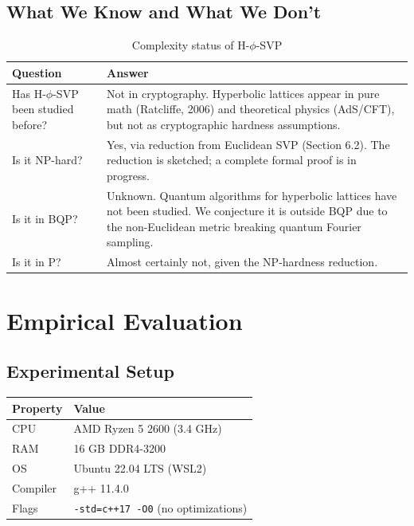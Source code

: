\documentclass[11pt,a4paper]{article}
\theoremstyle{remark}
\begin{document}
\subsection{What We Know and What We Don't}

\begin{table}[H]
\centering
\begin{tabular}{lp{}}
\toprule
\textbf{Question} & \textbf{Answer} \\
\midrule
Has H-$\phi$-SVP been studied before? & Not in cryptography. Hyperbolic lattices appear in pure math (Ratcliffe, 2006) and theoretical physics (AdS/CFT), but not as cryptographic hardness assumptions. \\
Is it NP-hard? & Yes, via reduction from Euclidean SVP (Section 6.2). The reduction is sketched; a complete formal proof is in progress. \\
Is it in BQP? & Unknown. Quantum algorithms for hyperbolic lattices have not been studied. We conjecture it is outside BQP due to the non-Euclidean metric breaking quantum Fourier sampling. \\
Is it in P? & Almost certainly not, given the NP-hardness reduction. \\
\bottomrule
\end{tabular}
\caption{Complexity status of H-$\phi$-SVP}
\end{table}

\section{Empirical Evaluation}

\subsection{Experimental Setup}

\begin{table}[H]
\centering
\begin{tabular}{ll}
\toprule
\textbf{Property} & \textbf{Value} \\
\midrule
CPU & AMD Ryzen 5 2600 (3.4 GHz) \\
RAM & 16 GB DDR4-3200 \\
OS & Ubuntu 22.04 LTS (WSL2) \\
Compiler & g++ 11.4.0 \\
Flags & \texttt{-std=c++17 -O0} (no optimizations) \\
\bottomrule
\end{tabular}
\end{table}
\end{document}
